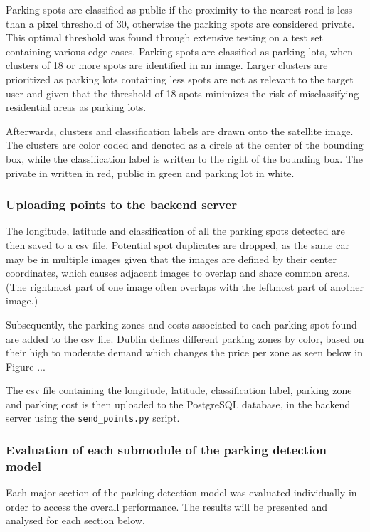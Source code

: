 Parking spots are classified as public if the proximity to the nearest road is less than a pixel threshold of 30, otherwise the parking spots are considered private. This optimal threshold was found through extensive testing on a test set containing various edge cases.
Parking spots are classified as parking lots, when clusters of 18 or more spots are identified in an image. Larger clusters are prioritized as parking lots containing less spots are not as relevant to the target user and given that the threshold of 18 spots minimizes the risk of misclassifying residential areas as parking lots.

Afterwards, clusters and classification labels are drawn onto the satellite image. The clusters are color coded and denoted as a circle at the center of the bounding box, while the classification label is written to the right of the bounding box. The private in written in red, public in green and parking lot in white.

\subsubsection{Uploading points to the backend server}
The longitude, latitude and classification of all the parking spots detected are then saved to a csv file.
Potential spot duplicates are dropped, as the same car may be in multiple images given that the images are defined by their center coordinates, which causes adjacent images to overlap and share common areas. (The rightmost part of one image often overlaps with the leftmost part of another image.)

Subsequently, the parking zones and costs associated to each parking spot found are added to the csv file.
Dublin defines different parking zones by color, based on their high to moderate demand which changes the price per zone as seen below in Figure ...

The csv file containing the longitude, latitude, classification label, parking zone and parking cost is then uploaded to the PostgreSQL database, in the backend server using the \texttt{send\_points.py} script.

\subsubsection{Evaluation of each submodule of the parking detection model}
Each major section of the parking detection model was evaluated individually in order to access the overall performance. The results will be presented and analysed for each section below.

